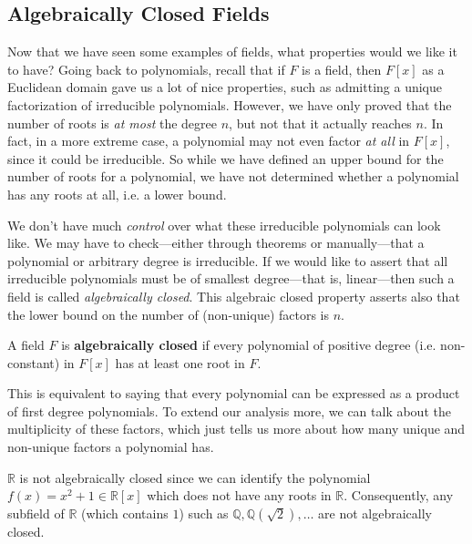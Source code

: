 \subsection{Algebraically Closed Fields} 

  Now that we have seen some examples of fields, what properties would we like it to have? Going back to polynomials, recall that if $F$ is a field, then $F[x]$ as a Euclidean domain gave us a lot of nice properties, such as admitting a unique factorization of irreducible polynomials. However, we have only proved that the number of roots is \textit{at most} the degree $n$, but not that it actually reaches $n$. In fact, in a more extreme case, a polynomial may not even factor \textit{at all} in $F[x]$, since it could be irreducible. So while we have defined an upper bound for the number of roots for a polynomial, we have not determined whether a polynomial has any roots at all, i.e. a lower bound. 

  We don't have much \textit{control} over what these irreducible polynomials can look like. We may have to check---either through theorems or manually---that a polynomial or arbitrary degree is irreducible. If we would like to assert that all irreducible polynomials must be of smallest degree---that is, linear---then such a field is called \textit{algebraically closed}. 
  This algebraic closed property asserts also that the lower bound on the number of (non-unique) factors is $n$. 

  \begin{definition}
    A field $F$ is \textbf{algebraically closed} if every polynomial of positive degree (i.e. non-constant) in $F[x]$ has at least one root in $F$. 
  \end{definition}

  This is equivalent to saying that every polynomial can be expressed as a product of first degree polynomials. To extend our analysis more, we can talk about the multiplicity of these factors, which just tells us more about how many unique and non-unique factors a polynomial has. 

  \begin{example}
    $\mathbb{R}$ is not algebraically closed since we can identify the polynomial $f(x) = x^2 + 1 \in \mathbb{R}[x]$ which does not have any roots in $\mathbb{R}$. Consequently, any subfield of $\mathbb{R}$ (which contains $1$) such as $\mathbb{Q}, \mathbb{Q}(\sqrt{2}), \ldots$ are not algebraically closed. 
  \end{example}

